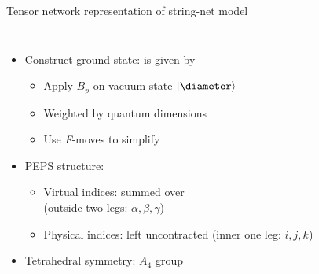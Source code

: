 \documentclass{fdubeamer}
\begin{document}
\begin{frame}{Tensor network representation of string-net model}

\begin{columns}[c]


    \begin{itemize}
      \item Construct ground state: is given by 

        \begin{itemize}
          \item Apply $B_p$ on vacuum state $\ket{\diameter}$
          \item Weighted by quantum dimensions
          \item Use \textit{F}-moves to simplify
        \end{itemize}

      \item PEPS structure:

        \begin{itemize}
          \item Virtual indices: summed over \\
            \mbox{\qquad} (outside two legs: $\alpha,\beta,\gamma$)
          \item Physical indices: left uncontracted
            \mbox{\qquad} (inner one leg: $i,j,k$)
        \end{itemize}

      \item Tetrahedral symmetry: $A_4$ group
    \end{itemize}



\end{columns}
\end{frame}
\end{document}
